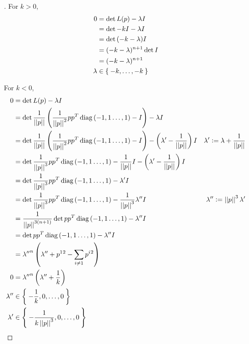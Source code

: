 \documentclass[stu, babel, american, biblatex, a4paper, leqno, draftall]{apa7}
\begin{document}
\begin{proof}[]
    \skipped

    For $k>0$,
    \begin{align*}
        0
        &= \det{L(p)-\lambda I} \\
        &= \det{-k I-\lambda I} \\
        &= \det{(-k-\lambda) I} \\
        &= (-k-\lambda)^{n+1}\det{I} \\
        &= (-k-\lambda)^{n+1} \\
        \lambda &\in \Set{-k,\dots,-k}
    \end{align*}

    For $k<0$,
    \begin{align*}
        0
        &= \det{L(p)-\lambda I} \\
        &= \det{\frac{1}{\norm{p}} \left(\frac{1}{\norm{p}^2} p p^T \diag{\left(-1,1\dots,1\right)} - I\right)-\lambda I} \\
        &= \det{\frac{1}{\norm{p}} \left(\frac{1}{\norm{p}^2} p p^T \diag{\left(-1,1\dots,1\right)} - I\right)-\left(\lambda^\prime-\frac{1}{\norm{p}}\right) I} & \text{$\lambda^\prime \defeq \lambda + \frac{1}{\norm{p}}$}\\
        &= \det{\frac{1}{\norm{p}^3} p p^T \diag{\left(-1,1\dots,1\right)} - \frac{1}{\norm{p}}I-\left(\lambda^\prime-\frac{1}{\norm{p}}\right) I}\\
        &= \det{\frac{1}{\norm{p}^3} p p^T \diag{\left(-1,1\dots,1\right)} - \lambda^\prime I}\\
        &= \det{\frac{1}{\norm{p}^3} p p^T \diag{\left(-1,1\dots,1\right)} - \frac{1}{\norm{p}^3}\lambda^{\prime\prime} I} & \text{$\lambda^{\prime\prime} \defeq \norm{p}^3\lambda^\prime$}\\
        &= \frac{1}{\norm{p}^{3(n+1)}}\det{p p^T \diag{\left(-1,1\dots,1\right)} - \lambda^{\prime\prime} I}\\
        &= \det{p p^T \diag{\left(-1,1\dots,1\right)} - \lambda^{\prime\prime} I}\\
        &= {\lambda^{\prime\prime}}^n\left(\lambda^{\prime\prime}+\tensor{p}{^1}^2-\sum_{i\ne 1}{\tensor{p}{^i}^2}\right) \\
        0 &= {\lambda^{\prime\prime}}^n\left(\lambda^{\prime\prime}+\frac{1}{k}\right) \\
        \lambda^{\prime\prime} &\in \Set{-\frac{1}{k},0,\dots,0} \\
        \lambda^\prime &\in \Set{-\frac{1}{k\norm{p}^3},0,\dots,0} \\

\end{align*}
\end{proof}
\end{document}
